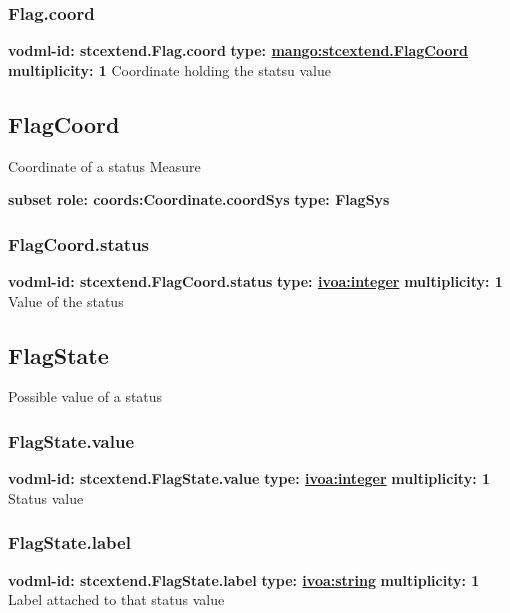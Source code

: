     \subsubsection{Flag.coord}
      \textbf{vodml-id: stcextend.Flag.coord} \newline
      \textbf{type: \hyperref[sect:stcextend.FlagCoord]{mango:stcextend.FlagCoord}} \newline
      \textbf{multiplicity: 1} \newline 
      Coordinate holding the statsu value

  \subsection{FlagCoord}
  \label{sect:stcextend.FlagCoord}
    Coordinate of a status Measure

    \noindent \textbf{subset} \newline
    \indent   \textbf{role: coords:Coordinate.coordSys} \newline
    \indent   \textbf{type: FlagSys} \newline


    \subsubsection{FlagCoord.status}
      \textbf{vodml-id: stcextend.FlagCoord.status} \newline
      \textbf{type: \hyperref[sect:ivoa]{ivoa:integer}} \newline
      \textbf{multiplicity: 1} \newline 
      Value of the status

  \subsection{FlagState}
  \label{sect:stcextend.FlagState}
    Possible value of a status

    \subsubsection{FlagState.value}
      \textbf{vodml-id: stcextend.FlagState.value} \newline
      \textbf{type: \hyperref[sect:ivoa]{ivoa:integer}} \newline
      \textbf{multiplicity: 1} \newline 
      Status value

    \subsubsection{FlagState.label}
      \textbf{vodml-id: stcextend.FlagState.label} \newline
      \textbf{type: \hyperref[sect:ivoa]{ivoa:string}} \newline
      \textbf{multiplicity: 1} \newline 
      Label attached to that status value


